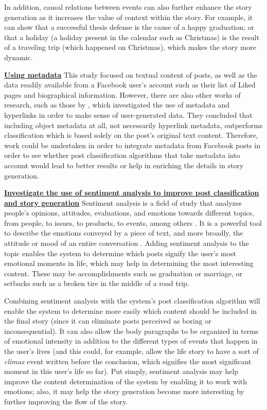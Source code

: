 In addition, causal relations between events can also further enhance the story generation as it increases the value of context within the story. For example, it can show that a successful thesis defense is the cause of a happy graduation; or that a holiday (a holiday present in the calendar such as Christmas) is the result of a traveling trip (which happened on Christmas), which makes the story more dynamic.

\underline{\textbf{Using metadata}}
This study focused on textual content of posts, as well as the data readily available from a Facebook user’s account such as their list of Liked pages and biographical information. However, there are also other works of research, such as those by \cite{DBLP:conf/ecir/KinsellaPB11}, which investigated the use of metadata and hyperlinks in order to make sense of user-generated data. They concluded that including object metadata at all, not necessarily hyperlink metadata, outperforms classification which is based solely on the post’s original text content. Therefore, work could be undertaken in order to integrate metadata from Facebook posts in order to see whether post classification algorithms that take metadata into account would lead to better results or help in enriching the details in story generation.

\underline{\textbf{Investigate the use of sentiment analysis to improve post classification}}
\underline{\textbf{ and story generation}}
Sentiment analysis is a field of study that analyzes people’s opinions, attitudes, evaluations, and emotions towards different topics, from people, to issues, to products, to events, among others \cite{Liu12sentimentanalysi}. It is a powerful tool to describe the emotions conveyed by a piece of text, and more broadly, the attitude or mood of an entire conversation \cite{DBLP:journals/corr/VarolFDMF17}. Adding sentiment analysis to the topic enables the system to determine which posts signify the user’s most emotional moments in life, which may help in determining the most interesting content. These may be accomplishments such as graduation or marriage, or setbacks such as a broken tire in the middle of a road trip. 

Combining sentiment analysis with the system’s post classification algorithm will enable the system to determine more easily which content should be included in the final story (since it can eliminate posts perceived as boring or inconsequential). It can also allow the body paragraphs to be organized in terms of emotional intensity in addition to the different types of events that happen in the user’s lives (and this could, for example, allow the life story to have a sort of \textit{climax} event written before the conclusion, which signifies the most significant moment in this user’s life so far). Put simply, sentiment analysis may help improve the content determination of the system by enabling it to work with emotions; also, it may help the story generation become more interesting by further improving the flow of the story.

